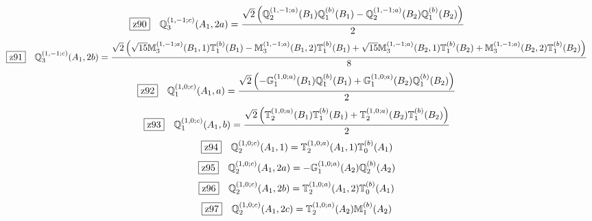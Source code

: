 \documentclass[fleqn,10pt,landscape]{jsarticle}
\begin{document}
\begin{dmath*}
\hspace*{3mm}\fbox{z90}\quad \mathbb{Q}_{3}^{(1,-1;c)}(A_{1},2a)=\frac{\sqrt{2} \left(\mathbb{Q}_{2}^{(1,-1;a)}(B_{1}) \mathbb{Q}_{1}^{(b)}(B_{1}) - \mathbb{Q}_{2}^{(1,-1;a)}(B_{2}) \mathbb{Q}_{1}^{(b)}(B_{2})\right)}{2}
\end{dmath*}
\begin{dmath*}
\hspace*{3mm}\fbox{z91}\quad \mathbb{Q}_{3}^{(1,-1;c)}(A_{1},2b)=\frac{\sqrt{2} \left(\sqrt{15} \mathbb{M}_{3}^{(1,-1;a)}(B_{1},1) \mathbb{T}_{1}^{(b)}(B_{1}) - \mathbb{M}_{3}^{(1,-1;a)}(B_{1},2) \mathbb{T}_{1}^{(b)}(B_{1}) + \sqrt{15} \mathbb{M}_{3}^{(1,-1;a)}(B_{2},1) \mathbb{T}_{1}^{(b)}(B_{2}) + \mathbb{M}_{3}^{(1,-1;a)}(B_{2},2) \mathbb{T}_{1}^{(b)}(B_{2})\right)}{8}
\end{dmath*}
\begin{dmath*}
\hspace*{3mm}\fbox{z92}\quad \mathbb{Q}_{1}^{(1,0;c)}(A_{1},a)=\frac{\sqrt{2} \left(- \mathbb{G}_{1}^{(1,0;a)}(B_{1}) \mathbb{Q}_{1}^{(b)}(B_{1}) + \mathbb{G}_{1}^{(1,0;a)}(B_{2}) \mathbb{Q}_{1}^{(b)}(B_{2})\right)}{2}
\end{dmath*}
\begin{dmath*}
\hspace*{3mm}\fbox{z93}\quad \mathbb{Q}_{1}^{(1,0;c)}(A_{1},b)=\frac{\sqrt{2} \left(\mathbb{T}_{2}^{(1,0;a)}(B_{1}) \mathbb{T}_{1}^{(b)}(B_{1}) + \mathbb{T}_{2}^{(1,0;a)}(B_{2}) \mathbb{T}_{1}^{(b)}(B_{2})\right)}{2}
\end{dmath*}
\begin{dmath*}
\hspace*{3mm}\fbox{z94}\quad \mathbb{Q}_{2}^{(1,0;c)}(A_{1},1)=\mathbb{T}_{2}^{(1,0;a)}(A_{1},1) \mathbb{T}_{0}^{(b)}(A_{1})
\end{dmath*}
\begin{dmath*}
\hspace*{3mm}\fbox{z95}\quad \mathbb{Q}_{2}^{(1,0;c)}(A_{1},2a)=- \mathbb{G}_{1}^{(1,0;a)}(A_{2}) \mathbb{Q}_{2}^{(b)}(A_{2})
\end{dmath*}
\begin{dmath*}
\hspace*{3mm}\fbox{z96}\quad \mathbb{Q}_{2}^{(1,0;c)}(A_{1},2b)=\mathbb{T}_{2}^{(1,0;a)}(A_{1},2) \mathbb{T}_{0}^{(b)}(A_{1})
\end{dmath*}
\begin{dmath*}
\hspace*{3mm}\fbox{z97}\quad \mathbb{Q}_{2}^{(1,0;c)}(A_{1},2c)=\mathbb{T}_{2}^{(1,0;a)}(A_{2}) \mathbb{M}_{1}^{(b)}(A_{2})
\end{dmath*}
\end{document}
